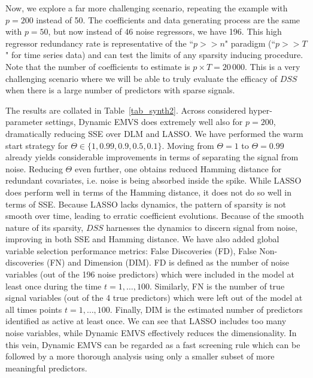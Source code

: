 \documentclass[ba]{imsart}
\numberwithin{equation}{section}
\theoremstyle{plain}
\def\B{\mbox{\boldmath$B$}}
\def\B{\mbox{\boldmath$B$}}
\newcommand{\bm}[1]{\boldsymbol{#1}}
\newcommand{\wh}[1]{\smash{\widehat{#1}}}
\def\B{\bm{B}}
\begin{document}
{Now, we explore a far more challenging scenario, repeating the example with $p=200$ instead of 50.
The coefficients and data generating process are the same with $p=50$, but now instead of 46 noise regressors, we have 196.
This high regressor redundancy rate is representative of the ``$p>>n$" paradigm (``$p>>T$" for time series data) and can test the limits of any sparsity inducing procedure.
Note that the number of coefficients to estimate is $p\times T=20\,000$. This is a very challenging scenario where  we will be able to truly evaluate the efficacy of $DSS$  when there is a large number of predictors with sparse signals.

The results are collated in Table~\ref{tab_synth2}.  Across considered hyper-parameter settings, Dynamic EMVS  does extremely well also for $p=200$, dramatically reducing SSE over DLM and LASSO.
We have performed the warm start strategy for $\Theta\in\{1,0.99,0.9,0.5,0.1\}$. Moving from $\Theta=1$ to $\Theta=0.99$ already yields considerable improvements in terms of separating the signal  from noise. Reducing $\Theta$ even further, one obtains  reduced  Hamming distance for redundant covariates, i.e.  noise  is being absorbed inside the spike. 
While LASSO does perform well in terms of  the Hamming distance, it does not do so well in terms of SSE.
Because LASSO lacks dynamics, the pattern of sparsity is not smooth over time, leading to erratic coefficient evolutions.
Because of the smooth nature of its sparsity, $DSS$ harnesses the dynamics to discern signal from noise, improving in both SSE and Hamming distance.
We have also added global variable selection performance metrics: False Discoveries (FD), False Non-discoveries (FN) and Dimension (DIM).
FD is defined as the number of noise variables (out of the 196 noise predictors) which were included in the model at least once during the time $t=1,\dots, 100$.
Similarly, FN is the number of true signal variables (out of the 4 true predictors) which were left out of the model  at all times points $t=1,\dots, 100$. Finally, DIM is the estimated number of predictors
identified as active at least once. We can see that LASSO includes too many noise variables, while Dynamic EMVS effectively reduces the dimensionality. 
In this vein, Dynamic EMVS can be regarded as a fast screening rule which can be followed by a more thorough analysis using only a smaller subset of more meaningful predictors.

}
\end{document}
